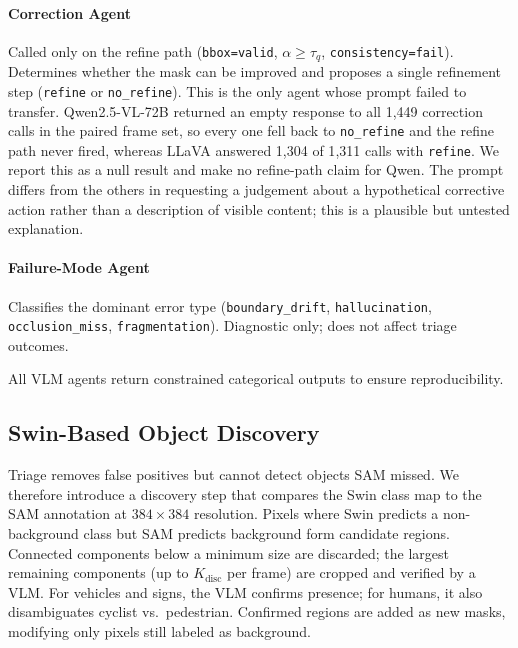 \documentclass[conference]{IEEEtran}
\begin{document}
\paragraph{Correction Agent}
Called only on the refine path (\texttt{bbox=valid}, $\alpha{\geq}\tau_q$, \texttt{consistency=fail}).
Determines whether the mask can be improved and proposes a single refinement step (\texttt{refine} or \texttt{no\_refine}).
This is the only agent whose prompt failed to transfer.
Qwen2.5-VL-72B returned an empty response to all 1{,}449 correction calls in the paired frame set, so every one fell back to \texttt{no\_refine} and the refine path never fired, whereas LLaVA answered 1{,}304 of 1{,}311 calls with \texttt{refine}.
We report this as a null result and make no refine-path claim for Qwen.
The prompt differs from the others in requesting a judgement about a hypothetical corrective action rather than a description of visible content; this is a plausible but untested explanation.

\paragraph{Failure-Mode Agent}
Classifies the dominant error type (\texttt{boundary\_drift}, \texttt{hallucination}, \texttt{occlusion\_miss}, \texttt{fragmentation}). 
Diagnostic only; does not affect triage outcomes.

All VLM agents return constrained categorical outputs to ensure reproducibility.

\subsection{Swin-Based Object Discovery}

Triage removes false positives but cannot detect objects SAM missed. 
We therefore introduce a discovery step that compares the Swin class map to the SAM annotation at $384{\times}384$ resolution. 
Pixels where Swin predicts a non-background class but SAM predicts background form candidate regions. 
Connected components below a minimum size are discarded; the largest remaining components (up to $K_{\text{disc}}$ per frame) are cropped and verified by a VLM. 
For vehicles and signs, the VLM confirms presence; for humans, it also disambiguates cyclist vs.\ pedestrian. 
Confirmed regions are added as new masks, modifying only pixels still labeled as background.
\end{document}
